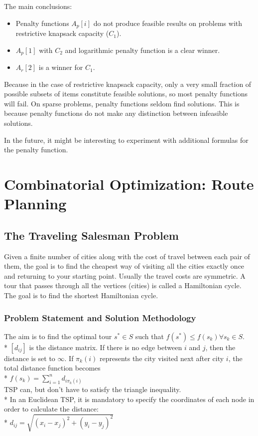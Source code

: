 \documentclass[12pt]{book}
\newcounter{subsubsubsection}[subsubsection]
\begin{document}
The main conclusions:
\begin{itemize}
\item Penalty functions $A_p[i]$ do not produce feasible results on problems with restrictive knapsack capacity ($C_1$).
\item $A_p[1]$ with $C_2$ and logarithmic penalty function is a clear winner.
\item $A_r[2]$ is a winner for $C_1$.
\end{itemize}
Because in the case of restrictive knapsack capacity, only a very small fraction of possible subsets of items constitute feasible solutions, so most penalty functions will fail. On sparse problems, penalty functions seldom find solutions. This is because penalty functions do not make any distinction between infeasible solutions.

In the future, it might be interesting to experiment with additional formulas for the penalty function.
\clearpage

\setcounter{section}{7}
\chapter{Combinatorial Optimization: Route Planning}
\section{The Traveling Salesman Problem}
Given a finite number of cities along with the cost of travel between each pair of them, the goal is to find the cheapest way of visiting all the cities exactly once and returning to your starting point. Usually the travel costs are symmetric. A tour that passes through all the vertices (cities) is called a Hamiltonian cycle. The goal is to find the shortest Hamiltonian cycle.
\subsection{Problem Statement and Solution Methodology}
The aim is to find the optimal tour $s^* \in S$ such that $f(s^*) \leq f(s_k) \forall s_k \in S$.\\*
$[d_{ij}]$ is the distance matrix. If there is no edge between $i$ and $j$, then the distance is set to $\infty$. If $\pi_k(i)$ represents the city visited next after city $i$, the total distance function becomes\\*
$f(s_k) = \sum_{i=1}^nd_{i\pi_k(i)}$\\
TSP can, but don't have to satisfy the triangle inequality.\\*
In an Euclidean TSP, it is mandatory to specify the coordinates of each node in order to calculate the distance:\\*
$d_{ij} = \sqrt{(x_i-x_j)^2 + (y_i - y_j)^2}$
\end{document}
